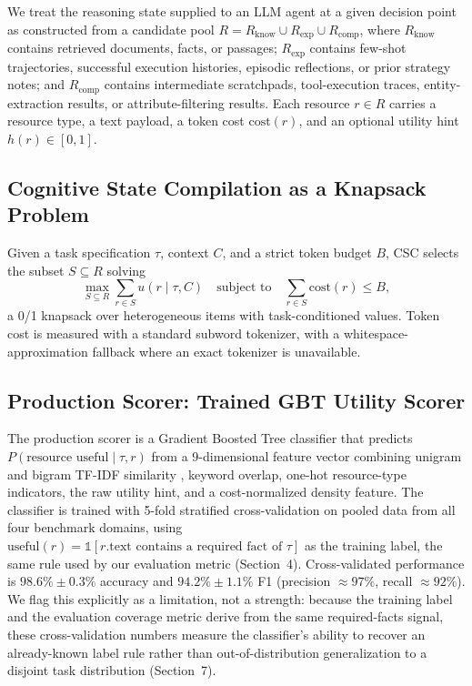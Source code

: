 \documentclass{article}
\begin{document}
We treat the reasoning state supplied to an LLM agent at a given decision point as constructed from a candidate pool $R = R_{\text{know}} \cup R_{\text{exp}} \cup R_{\text{comp}}$, where $R_{\text{know}}$ contains retrieved documents, facts, or passages; $R_{\text{exp}}$ contains few-shot trajectories, successful execution histories, episodic reflections, or prior strategy notes; and $R_{\text{comp}}$ contains intermediate scratchpads, tool-execution traces, entity-extraction results, or attribute-filtering results. Each resource $r \in R$ carries a resource type, a text payload, a token cost $\text{cost}(r)$, and an optional utility hint $h(r) \in [0,1]$.

\subsection{Cognitive State Compilation as a Knapsack Problem}

Given a task specification $\tau$, context $C$, and a strict token budget $B$, CSC selects the subset $S \subseteq R$ solving
\begin{equation}
\max_{S \subseteq R} \sum_{r \in S} u(r \mid \tau, C) \quad \text{subject to} \quad \sum_{r \in S} \text{cost}(r) \leq B,
\end{equation}
a 0/1 knapsack over heterogeneous items with task-conditioned values. Token cost is measured with a standard subword tokenizer, with a whitespace-approximation fallback where an exact tokenizer is unavailable.

\subsection{Production Scorer: Trained GBT Utility Scorer}

The production scorer is a Gradient Boosted Tree classifier \citep{chen2016xgboost} that predicts $P(\text{resource useful} \mid \tau, r)$ from a 9-dimensional feature vector combining unigram and bigram TF-IDF similarity \citep{pedregosa2011scikit}, keyword overlap, one-hot resource-type indicators, the raw utility hint, and a cost-normalized density feature. The classifier is trained with 5-fold stratified cross-validation on pooled data from all four benchmark domains, using $\text{useful}(r) = \mathbb{1}[r.\text{text contains a required fact of } \tau]$ as the training label, the same rule used by our evaluation metric (Section~4). Cross-validated performance is $98.6\% \pm 0.3\%$ accuracy and $94.2\% \pm 1.1\%$ F1 (precision $\approx 97\%$, recall $\approx 92\%$). We flag this explicitly as a limitation, not a strength: because the training label and the evaluation coverage metric derive from the same required-facts signal, these cross-validation numbers measure the classifier's ability to recover an already-known label rule rather than out-of-distribution generalization to a disjoint task distribution (Section~7).
\end{document}
